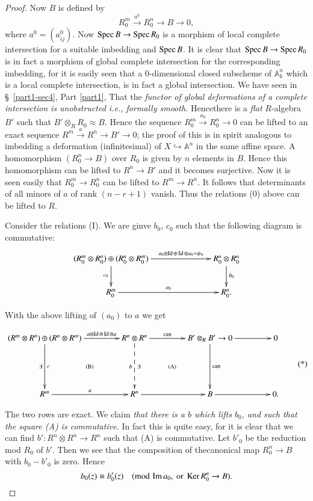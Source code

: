 \begin{proof}
Now $B$ is defined by
$$
R^{m}_{0}\xrightarrow{a^{0}}R^{n}_{0}\to B\to 0,
$$
where $a^{0}=(a^{0}_{ij})$. Now $\operatorname{Spec} B\to \operatorname{Spec} R_{0}$ is a morphism
of local complete intersection for a suitable imbedding and $\operatorname{Spec}
B$. It is clear that $\operatorname{Spec} B\to \operatorname{Spec} R_{0}$ is in fact a morphism of
global complete intersection for the corresponding imbedding, for it
is easily seen that a $0$-dimensional closed subscheme of
$\mathbb{A}^{n}_{k}$ which is a local complete intersection, is in
fact a global intersection. We have seen in \S\ \ref{part1-sec4}, Part
\ref{part1}, That the {\em functor of global deformations of a
  complete intersection is unobstructed i.e., formally smooth.}
Hence\pageoriginale there is a {\em flat} $R$-algebra $B'$ such that
$B'\otimes_{R}R_{0}\approx B$. Hence the sequence
$R^{m}_{0}\xrightarrow{a_{0}}R^{n}_{0}\to 0$ can be lifted to an exact
sequence $R^{m}\xrightarrow{a}R^{n}\to B'\to 0$; the proof of this is
in spirit analogous to imbedding a deformation (infinitesimal) of
$X\hookrightarrow \mathbb{A}^{n}$ in the same affine space. A
homomorphism $(R^{n}_{0}\to B)$ over $R_{0}$ is given by $n$ elements
in $B$. Hence this homomorphism can be lifted to $R^{n}\to B'$ and it
becomes surjective. Now it is seen easily that $R^{m}_{0}\to
R^{n}_{0}$ can be lifted to $R^{m}\to R^{n}$. It follows that
determinants of all minors of $a$ of rank $(n-r+1)$ vanish. Thus the
relations (0) above can be lifted to $R$. 

Consider the relations (I). We are ginve $b_{0}$, $c_{0}$ such that
the following diagram is commutative:
\[
\xymatrix@C=2.5cm{
(R^{m}_{0}\otimes R^{n}_{0})\oplus (R^{n}_{0}\otimes
  R^{m}_{0})\ar[d]_{c_{0}}\ar[r]^-{a_{0}\otimes \Id \oplus \Id \otimes
  a_{0}=\psi_{0}} & R^{n}_{0}\otimes R^{n}_{0}\ar[d]^{b_{0}}\\
R^{m}_{0}\ar[r]^-{a_{0}} & R^{n}_{0}.
}
\]

With the above lifting of $(a_{0})$ to $a$ we get
\begin{landscape}
\begin{equation*}
\vcenter{
\xymatrix@C=1.5cm{
(R^{m}\otimes R^{n})\oplus (R^{n}\otimes
  R^{m})\ar[dd]^{c}_{\exists}\ar[r]^-{a\otimes\Id\oplus\Id\otimes a} &
  R^{n}\otimes R^{n}\ar@{-->}[dd]_{b}^{\exists}\ar[r]^-{\text{can}} &
  B'\otimes_{R}B'\to 0\ar[dd]^{\text{can}}\ar[r] & 0\\
\ar@{}[r]|{\rm(B)} & \ar@{}[r]|{\rm(A)} & \\
R^{m}\ar[r]^-{a} & R^{n}\ar[r] & B\ar[r] & 0.
}}\tag{*}
\end{equation*}
\end{landscape}
The two rows are exact. We claim {\em that there is a $b$ which lifts
  $b_{0}$, and such that the square {\em(A)} is commutative.} In fact this
  is quite easy, for it is clear that we can find $b':R^{n}\otimes
  R^{n}\to R^{n}$ such that (A) is commutative. Let $b'_{0}$ be the
  reduction mod $R_{0}$ of $b'$. Then we see that the composition of
  the\pageoriginale canonical map $R^{n}_{0}\to B$ with $b_{0}-b'_{0}$
  is zero. Hence
$$
b_{0}(z)\equiv b'_{0}(z)\quad (\text{mod\,}\operatorname{Im} a_{0}, \text{~ or~
}\operatorname{Ker} R^{n}_{0}\to B).
$$


\end{proof}
